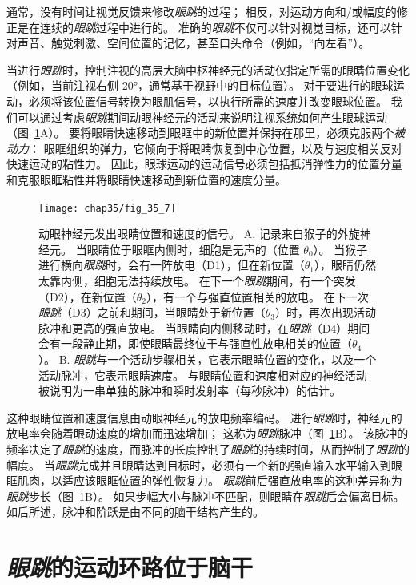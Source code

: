 通常，没有时间让视觉反馈来修改\textit{眼跳}的过程；
相反，对运动方向和/或幅度的修正是在连续的\textit{眼跳}过程中进行的。
准确的\textit{眼跳}不仅可以针对视觉目标，还可以针对声音、触觉刺激、空间位置的记忆，甚至口头命令（例如，“向左看”）。


当进行\textit{眼跳}时，控制注视的高层大脑中枢神经元的活动仅指定所需的眼睛位置变化（例如，当前注视右侧 20°，通常基于视野中的目标位置）。
对于要进行的眼球运动，必须将该位置信号转换为眼肌信号，以执行所需的速度并改变眼球位置。
我们可以通过考虑\textit{眼跳}期间动眼神经元的活动来说明注视系统如何产生眼球运动（图~\ref{fig:35_7}A）。
要将眼睛快速移动到眼眶中的新位置并保持在那里，必须克服两个\textit{被动力}：
眼眶组织的弹力，它倾向于将眼睛恢复到中心位置，以及与速度相关反对快速运动的粘性力。
因此，眼球运动的运动信号必须包括抵消弹性力的位置分量和克服眼眶粘性并将眼睛快速移动到新位置的速度分量。


\begin{figure}[htbp]
	\centering
	\texttt{[image: chap35/fig\_35\_7]}
	\caption{动眼神经元发出眼睛位置和速度的信号。
		A. 记录来自猴子的外旋神经元。
		当眼睛位于眼眶内侧时，细胞是无声的（位置 $ \theta_0 $）。
		当猴子进行横向\textit{眼跳}时，会有一阵放电（D1），但在新位置（$ \theta_1 $），眼睛仍然太靠内侧，细胞无法持续放电。
		在下一个\textit{眼跳}期间，有一个突发（D2），在新位置（$ \theta_2 $），有一个与强直位置相关的放电。
		在下一次\textit{眼跳}（D3）之前和期间，当眼睛处于新位置（$ \theta_3 $）时，再次出现活动脉冲和更高的强直放电。
		当眼睛向内侧移动时，在\textit{眼跳}（D4）期间会有一段静止期，即使眼睛最终位于与强直性放电相关的位置（$ \theta_4 $）\cite{fuchs1970firing}。
		B. \textit{眼跳}与一个活动步骤相关，它表示眼睛位置的变化，以及一个活动脉冲，它表示眼睛速度。
		与眼睛位置和速度相对应的神经活动被说明为一串单独的脉冲和瞬时发射率（每秒脉冲）的估计。}
	\label{fig:35_7}
\end{figure}


这种眼睛位置和速度信息由动眼神经元的放电频率编码。
进行\textit{眼跳}时，神经元的放电率会随着眼动速度的增加而迅速增加；
这称为\textit{眼跳}脉冲（图~\ref{fig:35_7}B）。
该脉冲的频率决定了\textit{眼跳}的速度，而脉冲的长度控制了\textit{眼跳}的持续时间，从而控制了\textit{眼跳}的幅度。
当\textit{眼跳}完成并且眼睛达到目标时，必须有一个新的强直输入水平输入到眼眶肌肉，以适应该眼眶位置的弹性恢复力。
\textit{眼跳}前后强直放电率的这种差异称为\textit{眼跳}步长（图~\ref{fig:35_7}B）。
如果步幅大小与脉冲不匹配，则眼睛在\textit{眼跳}后会偏离目标。
如后所述，脉冲和阶跃是由不同的脑干结构产生的。



\section{\textit{眼跳}的运动环路位于脑干}

